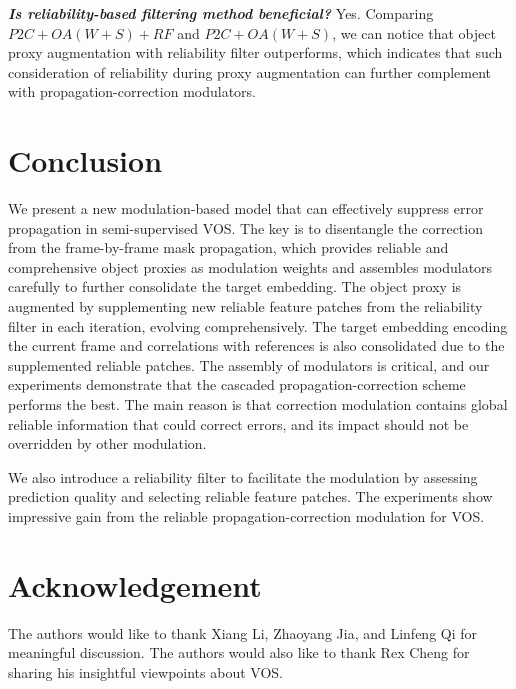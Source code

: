 \documentclass[letterpaper]{article} \usepackage{aaai22}  \usepackage{times}  \usepackage{helvet}  \usepackage{courier}  \usepackage[hyphens]{url}  \usepackage{graphicx} \urlstyle{rm} \def\UrlFont{\rm}  \usepackage{natbib}  \usepackage{caption} \DeclareCaptionStyle{ruled}{labelfont=normalfont,labelsep=colon,strut=off} \frenchspacing  \setlength{\pdfpagewidth}{8.5in}  \setlength{\pdfpageheight}{11in}  \usepackage{algorithm}
\begin{document}
\textbf{\textit{Is reliability-based filtering method beneficial?}} Yes. Comparing $P2C+OA(W+S)+RF$ and $P2C+OA(W+S)$, we can notice that object proxy augmentation with reliability filter outperforms, which indicates that such consideration of reliability during proxy augmentation can further complement with propagation-correction modulators. 
	
\section{Conclusion}
\label{sec:Conclusion}
We present a new modulation-based model that can effectively suppress error propagation in semi-supervised VOS.
The key is to disentangle the correction from the frame-by-frame mask propagation, which provides reliable and comprehensive object proxies as modulation weights and assembles modulators carefully to further consolidate the target embedding.
The object proxy is augmented by supplementing new reliable feature patches from the reliability filter in each iteration, evolving comprehensively. The target embedding encoding the current frame and correlations with references is also consolidated due to the supplemented reliable patches.
The assembly of modulators is critical, and our experiments demonstrate that the cascaded propagation-correction scheme performs the best. 
The main reason is that correction modulation contains global reliable information that could correct errors, and its impact should not be overridden by other modulation. 

We also introduce a reliability filter to facilitate the modulation by assessing prediction quality and selecting reliable feature patches. 
The experiments show impressive gain from the reliable propagation-correction modulation for VOS.
 
\section{Acknowledgement}
\label{sec:Acknowledgement}
The authors would like to thank Xiang Li, Zhaoyang Jia, and Linfeng Qi for meaningful discussion. The authors would also like to thank Rex Cheng for sharing his insightful viewpoints about VOS.  
%
 
\clearpage

\setcounter{table}{0}  
\setcounter{figure}{0}  
\renewcommand{\thetable}{\Alph{table}}
\renewcommand{\thefigure}{\Alph{figure}}
\end{document}
